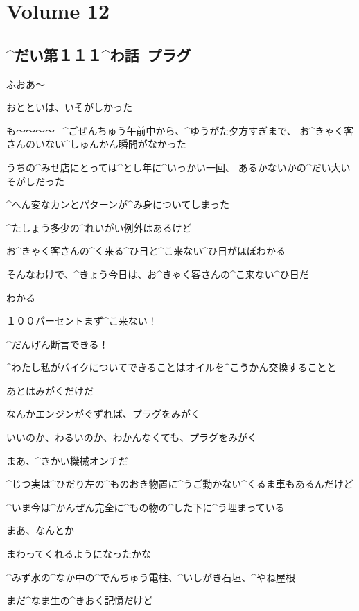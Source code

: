 \section{Volume 12}

\subsection{^{だい}{第}１１１^{わ}{話}\ プラグ}

\page[4]
\A ふおあ〜

\A おとといは、いそがしかった

\page
\A も〜〜〜〜
\ ^{ごぜんちゅう}{午前中}から、^{ゆうがた}{夕方}すぎまで、
お^{きゃく}{客}さんのいない^{しゅんかん}{瞬間}がなかった

\A うちの^{みせ}{店}にとっては^{とし}{年}に^{いっかい}{一回}、
あるかないかの^{だい}{大}いそがしだった

\A ^{へん}{変}なカンとパターンが^{み}{身}についてしまった

\A ^{たしょう}{多少}の^{れいがい}{例外}はあるけど

\A お^{きゃく}{客}さんの^{く}{来}る^{ひ}{日}と^{こ}{来}ない^{ひ}{日}がほぼわかる

\page
\A そんなわけで、^{きょう}{今日}は、お^{きゃく}{客}さんの^{こ}{来}ない^{ひ}{日}だ

\A わかる

\A １００パーセントまず^{こ}{来}ない！

\A ^{だんげん}{断言}できる！

\page
\A ^{わたし}{私}がバイクについてできることはオイルを^{こうかん}{交換}することと

\A あとはみがくだけだ

\A なんかエンジンがぐずれば、プラグをみがく

\A いいのか、わるいのか、わかんなくても、プラグをみがく

\A まあ、^{きかい}{機械}オンチだ

\A ^{じつ}{実}は^{ひだり}{左}の^{ものおき}{物置}に^{うご}{動}かない^{くるま}{車}もあるんだけど

\A ^{いま}{今}は^{かんぜん}{完全}に^{もの}{物}の^{した}{下}に^{う}{埋}まっている

\page[10]
\A まあ、なんとか

\A まわってくれるようになったかな

\page
\A ^{みず}{水}の^{なか}{中}の^{でんちゅう}{電柱}、^{いしがき}{石垣}、^{やね}{屋根}

\A まだ^{なま}{生}の^{きおく}{記憶}だけど

